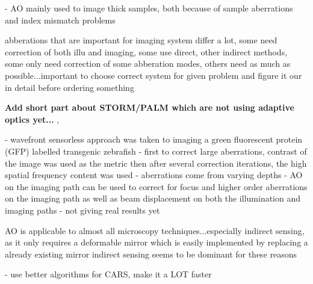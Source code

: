 - AO mainly used to image thick samples, both because of sample aberrations and index mismatch problems


abberations that are important for imaging system differ a lot, some need 
correction of both illu and imaging, some use direct, other indirect methods, 
some only need correction of some abberation modes, others need as much as 
possible...important to choose correct system for given problem and figure it 
our in detail before ordering something



\textbf{Add short part about STORM/PALM which are not using adaptive optics yet...
} \cite{future_AOM_PALM_1}, 

\cite{scan_lightSheet} 
- wavefront sensorless approach was taken to imaging a green fluorescent protein (GFP) labelled transgenic zebrafish
- first to correct large aberrations, contrast of the image was used as the metric then after several correction iterations, the high spatial frequency content was used
- aberrations come from varying depths
- AO on the imaging path can be used to correct for focus and higher order aberrations on the imaging path as well as beam displacement on both the illumination and imaging paths
- not giving real results yet


AO is applicable to almost all microscopy techniques...especially indirect sensing, as it only requires a deformable mirror which is easily implemented by replacing a already existing mirror
indirect sensing seems to be dominant for these reasons

- use better algorithms for CARS, make it a LOT faster


